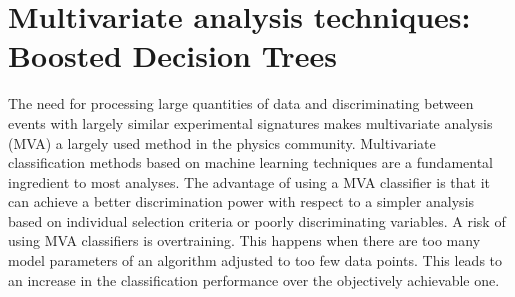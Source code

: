 \section{Multivariate analysis techniques: Boosted Decision Trees}
\label{sec:BDT}
The need for processing large quantities of data and discriminating between events with largely similar experimental signatures makes multivariate  analysis (MVA) a largely used method in the physics community. Multivariate classification methods based on machine learning techniques are a fundamental ingredient to most analyses. The advantage of using a MVA classifier is that it can achieve a better discrimination power with respect to a simpler analysis based on individual selection criteria or poorly discriminating variables. A risk of using MVA classifiers is overtraining.  This happens when there are too many model parameters of an algorithm adjusted to too few data points. This leads to an increase in the classification performance over the objectively achievable one.

